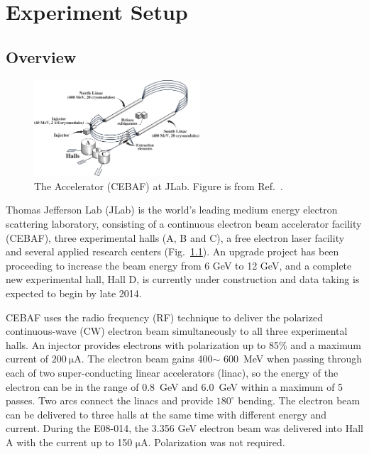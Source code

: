 \chapter{Experiment Setup}
\section{Overview}
 
\begin{figure}[!ht]
 \begin{center}
  \includegraphics[width=0.55\textwidth]{./figures/halla_jlab/CEBAF}
  \caption[The Accelerator (CEBAF) at JLab]{The Accelerator (CEBAF) at JLab. Figure is from Ref.~\cite{halla_nim}.}
  \label{cebaf}
 \end{center}
\end{figure}
Thomas Jefferson Lab (JLab) is the world's leading medium energy electron scattering laboratory, consisting of a continuous electron beam accelerator facility (CEBAF), three experimental halls (A, B and C), a free electron laser facility and several applied research centers (Fig.~\ref{cebaf}). An upgrade project has been proceeding to increase the beam energy from 6 GeV to 12 GeV, and a complete new experimental hall, Hall D, is currently under construction and data taking is expected to begin by late 2014.

 CEBAF uses the radio frequency (RF) technique to deliver the polarized continuous-wave (CW) electron beam simultaneously to all three experimental halls. An injector provides electrons with polarization up to 85\% and a maximum current of $\mathrm{200~\mu A}$. The electron beam gains 400$\sim$ 600~MeV when passing through each of two super-conducting linear accelerators (linac), so the energy of the electron can be in the range of 0.8~GeV and 6.0~GeV within a maximum of 5 passes. Two arcs connect the linacs and provide $\mathrm{180^{\circ}}$ bending. The electron beam can be delivered to three halls at the same time with different energy and current. During the E08-014, the 3.356 GeV electron beam was delivered into Hall A with the current up to 150 $\mathrm{\mu A}$. Polarization was not required.

